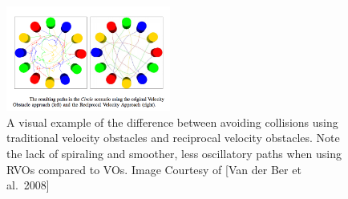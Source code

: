 \documentclass[tog]{acmsiggraph}
\begin{document}
\begin{figure}[h]
  \begin{center}
    \includegraphics[width=0.48\textwidth]{images/RVO}
  \end{center}
  \caption{A visual example of the difference between avoiding collisions using traditional velocity obstacles and reciprocal velocity obstacles. Note the lack of spiraling and smoother, less oscillatory paths when using RVOs compared to VOs. Image Courtesy of [Van der Ber et al.\ 2008] }
  \label{fig:rvo}
\end{figure}
\end{document}
